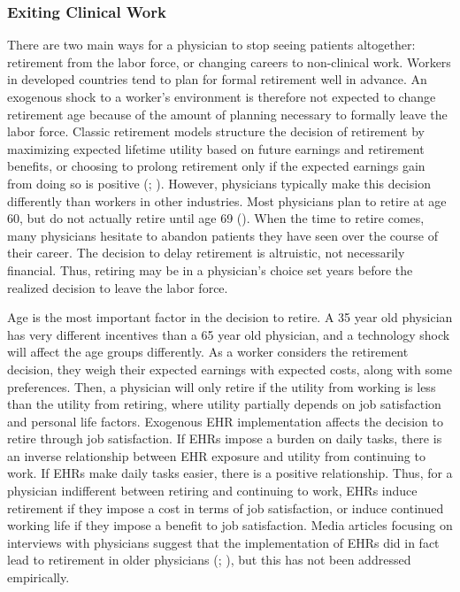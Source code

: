 \documentclass[12pt]{article}
\begin{document}
\subsubsection{Exiting Clinical Work}

There are two main ways for a physician to stop seeing patients altogether: retirement from the labor force, or changing careers to non-clinical work. Workers in developed countries tend to plan for formal retirement well in advance. An exogenous shock to a worker's environment is therefore not expected to change retirement age because of the amount of planning necessary to formally leave the labor force. Classic retirement models structure the decision of retirement by maximizing expected lifetime utility based on future earnings and retirement benefits, or choosing to prolong retirement only if the expected earnings gain from doing so is positive (\cite{gustman1986disaggregated}; \cite{stock1990pension}). However, physicians typically make this decision differently than workers in other industries. Most physicians plan to retire at age 60, but do not actually retire until age 69 (\cite{collier2017challenges}). When the time to retire comes, many physicians hesitate to abandon patients they have seen over the course of their career. The decision to delay retirement is altruistic, not necessarily financial. Thus, retiring may be in a physician's choice set years before the realized decision to leave the labor force. 

Age is the most important factor in the decision to retire. A 35 year old physician has very different incentives than a 65 year old physician, and a technology shock will affect the age groups differently. As a worker considers the retirement decision, they weigh their expected earnings with expected costs, along with some preferences. Then, a physician will only retire if the utility from working is less than the utility from retiring, where utility partially depends on job satisfaction and personal life factors. Exogenous EHR implementation affects the decision to retire through job satisfaction. If EHRs impose a burden on daily tasks, there is an inverse relationship between EHR exposure and utility from continuing to work. If EHRs make daily tasks easier, there is a positive relationship. Thus, for a physician indifferent between retiring and continuing to work, EHRs induce retirement if they impose a cost in terms of job satisfaction, or induce continued working life if they impose a benefit to job satisfaction. Media articles focusing on interviews with physicians suggest that the implementation of EHRs did in fact lead to retirement in older physicians (\cite{ringel_2019}; \cite{loria_2020}), but this has not been addressed empirically. 
\end{document}
